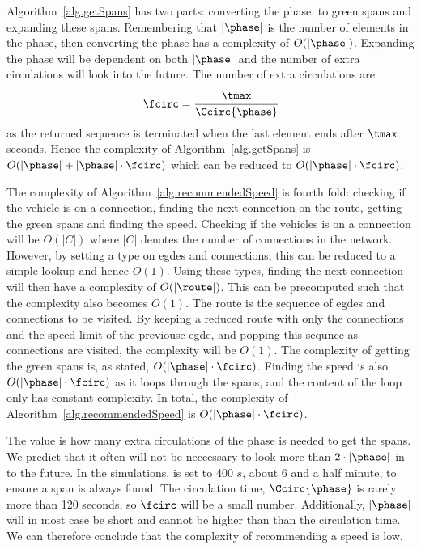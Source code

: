 Algorithm~\ref{alg.getSpans} has two parts: converting the phase, \phase to green spans and expanding these spans.
Remembering that $|\phase|$ is the number of elements in the phase, then converting the phase has a complexity of $O(|\phase|)$.
Expanding the phase will be dependent on both $|\phase|$ and the number of extra circulations will look into the future. 
The number of extra circulations are 
\[\fcirc = \cfrac{\tmax}{\Ccirc{\phase}}\]
as the returned sequence is terminated when the last element ends after $\tmax$ seconds.
Hence the complexity of Algorithm~\ref{alg.getSpans} is  $O(|\phase|+ |\phase|\cdot \fcirc)$ which can be reduced to $O(|\phase|\cdot \fcirc)$.

The complexity of Algorithm~\ref{alg.recommendedSpeed} is fourth fold: checking if the vehicle is on a connection, finding the next connection on the route, getting the green spans and finding the speed.
Checking if the vehicles is on a connection will be $O(|C|)$ where $|C|$ denotes the number of connections in the network.
However, by setting a type on egdes and connections, this can be reduced to a simple lookup and hence $O(1)$.
Using these types, finding the next connection will then have a complexity of $O(|\route|)$.
This can be precomputed such that the complexity also becomes $O(1)$.
The route is the sequence of egdes and connections to be visited.
By keeping a reduced route with only the connections and the speed limit of the previouse egde, and popping this sequnce as connections are visited, the complexity will be $O(1)$.
The complexity of getting the green spans is, as stated, $O(|\phase|\cdot \fcirc)$.
Finding the speed is also $O(|\phase|\cdot \fcirc)$ as it loops through the spans, and the content of the loop only has constant complexity.
In total, the complexity of Algorithm~\ref{alg.recommendedSpeed} is $O(|\phase|\cdot \fcirc)$.

The value \fcirc is how many extra circulations of the phase is needed to get the spans. 
We predict that it often will not be neccessary to look more than $2\cdot |\phase|$ in to the future.
In the simulations, \tmax is set to 400 $s$, about 6 and a half minute, to ensure a span is always found.
The circulation time, $\Ccirc{\phase}$ is rarely more than 120 seconds, so $\fcirc$ will be a small number.
Additionally, $|\phase|$ will in most case be short and cannot be higher than than the circulation time.
We can therefore conclude that the complexity of recommending a speed is low.

